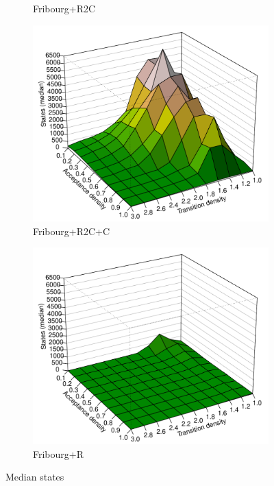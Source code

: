 \begin{figure}[ht]
\begin{subfigure}[t]{\perspwidth\textwidth}
  \caption{Fribourg+R2C}
  \end{subfigure}
  \hfill

  \hfill
  \begin{subfigure}[t]{\perspwidth\textwidth}
  \centering
  \includegraphics[width=\textwidth]{figures/r/internal/goal/s.median.Fribourg+R2C+C.pdf}
  \caption{Fribourg+R2C+C}
  \end{subfigure}
  \hfill
  \begin{subfigure}[t]{\perspwidth\textwidth}
  \centering
  \includegraphics[width=\textwidth]{figures/r/internal/goal/s.median.Fribourg+R.pdf}
  \caption{Fribourg+R}
  \end{subfigure}
  \hfill  
\caption{Median states}
\end{figure}

